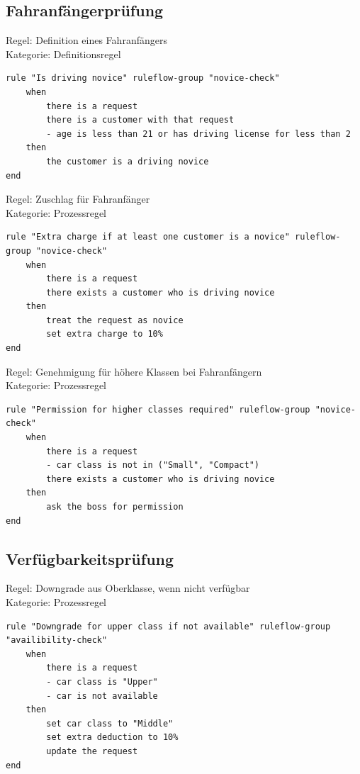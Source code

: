 \subsection{Fahranfängerprüfung}

Regel: Definition eines Fahranfängers \\
Kategorie: Definitionsregel

\begin{lstlisting}
rule "Is driving novice" ruleflow-group "novice-check"
	when
		there is a request
		there is a customer with that request
		- age is less than 21 or has driving license for less than 2	
	then
		the customer is a driving novice	
end
\end{lstlisting}

Regel: Zuschlag für Fahranfänger \\
Kategorie: Prozessregel

\begin{lstlisting}
rule "Extra charge if at least one customer is a novice" ruleflow-group "novice-check"
	when
		there is a request
		there exists a customer who is driving novice
	then
		treat the request as novice
		set extra charge to 10%	
end
\end{lstlisting}

Regel: Genehmigung für höhere Klassen bei Fahranfängern \\
Kategorie: Prozessregel

\begin{lstlisting}
rule "Permission for higher classes required" ruleflow-group "novice-check"
	when
		there is a request
		- car class is not in ("Small", "Compact")
		there exists a customer who is driving novice
	then
		ask the boss for permission
end
\end{lstlisting}

\subsection{Verfügbarkeitsprüfung}

Regel: Downgrade aus Oberklasse, wenn nicht verfügbar \\
Kategorie: Prozessregel

\begin{lstlisting}
rule "Downgrade for upper class if not available" ruleflow-group "availibility-check"
	when
		there is a request
		- car class is "Upper"
		- car is not available
	then
		set car class to "Middle"
		set extra deduction to 10%
		update the request
end
\end{lstlisting}

